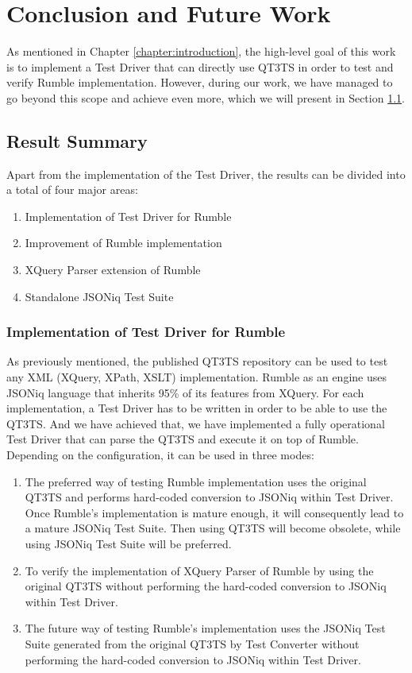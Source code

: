 \chapter{Conclusion and Future Work} 
\label{chapter:conclusions}
As mentioned in Chapter \ref{chapter:introduction}, the high-level goal of this work is to implement a Test Driver that can directly use QT3TS in order to test and verify Rumble implementation. However, during our work, we have managed to go beyond this scope and achieve even more, which we will present in Section \ref{sec:overallsummary}.

\section{Result Summary}
\label{sec:overallsummary}
Apart from the implementation of the Test Driver, the results can be divided into a total of four major areas:
\begin{enumerate}
	\item Implementation of Test Driver for Rumble
	\item Improvement of Rumble implementation
	\item XQuery Parser extension of Rumble
	\item Standalone JSONiq Test Suite
\end{enumerate}

\subsection{Implementation of Test Driver for Rumble}
As previously mentioned, the published QT3TS repository \cite{TestSuiteGitHubRepository} can be used to test any XML (XQuery, XPath, XSLT) implementation. Rumble as an engine uses JSONiq language that inherits 95\% of its features from XQuery. For each implementation, a Test Driver has to be written in order to be able to use the QT3TS. And we have achieved that, we have implemented a fully operational Test Driver that can parse the QT3TS and execute it on top of Rumble. Depending on the configuration, it can be used in three modes:
\begin{enumerate}
	\item The preferred way of testing Rumble implementation uses the original QT3TS and performs hard-coded conversion to JSONiq within Test Driver. Once Rumble's implementation is mature enough, it will consequently lead to a mature JSONiq Test Suite. Then using QT3TS will become obsolete, while using JSONiq Test Suite will be preferred.
	\item  To verify the implementation of XQuery Parser of Rumble by using the original QT3TS without performing the hard-coded conversion to JSONiq within Test Driver.
	\item The future way of testing Rumble's implementation uses the JSONiq Test Suite generated from the original QT3TS by Test Converter without performing the hard-coded conversion to JSONiq within Test Driver.
\end{enumerate} 

